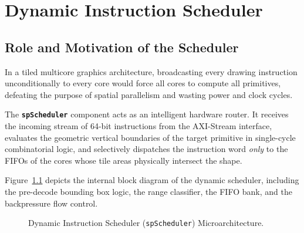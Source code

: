 \chapter{Dynamic Instruction Scheduler}
\label{chap:scheduler}

\section{Role and Motivation of the Scheduler}
In a tiled multicore graphics architecture, broadcasting every drawing instruction unconditionally to every core would force all cores to compute all primitives, defeating the purpose of spatial parallelism and wasting power and clock cycles.

The \textbf{\texttt{spScheduler}} component acts as an intelligent hardware router. It receives the incoming stream of 64-bit instructions from the AXI-Stream interface, evaluates the geometric vertical boundaries of the target primitive in single-cycle combinatorial logic, and selectively dispatches the instruction word \textit{only} to the FIFOs of the cores whose tile areas physically intersect the shape.

Figure~\ref{fig:scheduler} depicts the internal block diagram of the dynamic scheduler, including the pre-decode bounding box logic, the range classifier, the FIFO bank, and the backpressure flow control.

\begin{figure}[htbp]
\centering
\resizebox{0.95\textwidth}{!}{
    
}
\caption{Dynamic Instruction Scheduler (\texttt{spScheduler}) Microarchitecture.}
\label{fig:scheduler}
\end{figure}


